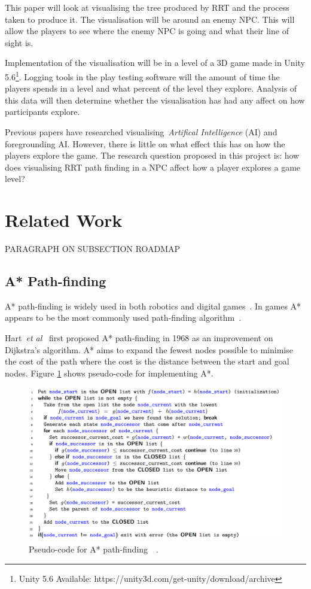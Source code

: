 \documentclass[journal]{IEEEtran}
\begin{document}
This paper will look at visualising the tree produced by RRT and the process taken to produce it. The visualisation will be around an enemy NPC. This will allow the players to see where the enemy NPC is going and what their line of sight is. 

Implementation of the visualisation will be in a level of a 3D game made in Unity 5.6\footnote[1]{Unity 5.6 Available: https://unity3d.com/get-unity/download/archive}. Logging tools in the play testing software will  the amount of time the players spends in a level and what percent of the level they explore. Analysis of this data will then determine whether the visualisation has had any affect on how participants explore.

Previous papers have researched visualising~\textit{Artifical Intelligence} (AI) and foregrounding AI. However, there is little on what effect this has on how the players explore the game.
The research question proposed in this project is: how does visualising RRT path finding in a NPC affect how a player explores a game level?

\section{Related Work} \label{RelatedWork}
PARAGRAPH ON SUBSECTION ROADMAP

\subsection{A* Path-finding} \label{A*PF}
A* path-finding is widely used in both robotics and digital games~\cite{Algfoor2015}. In games A* appears to be the most commonly used path-finding algorithm~\cite{Algfoor2015}.

Hart~\textit{et al}~\cite{Hart1968} first proposed A* path-finding in 1968 as an improvement on Dijkstra's algorithm. A* aims to expand the fewest nodes possible to minimise the cost of the path where the cost is the distance between the start and  goal nodes. Figure \ref{A*Pseudo} shows pseudo-code for implementing A*. 

\begin{figure}[H]
	\includegraphics[width=1.0\linewidth]{APseudocode.png}
	\caption{ Pseudo-code for A* path-finding~\cite{Hart1968}~\cite{pseudocode:A*}.}
	\label{A*Pseudo}
\end{figure} 
\end{document}
